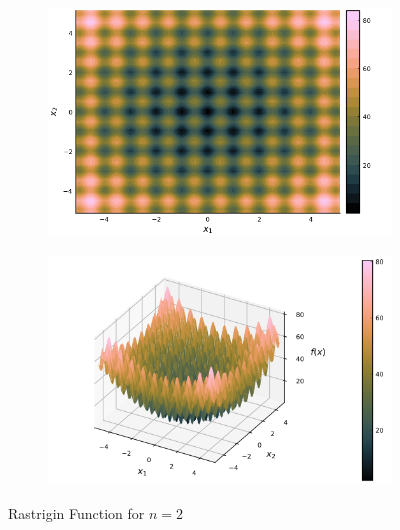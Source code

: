   \begin{figure}[ht!]
    \centering
    \begin{subfigure}[b]{0.4\textwidth}
      \centering
      \includegraphics[width=\textwidth]{img/test_functions/rastrigin_contour.png}
    \end{subfigure}
    \begin{subfigure}[b]{0.4\textwidth}
      \centering
      \includegraphics[width=\textwidth]{img/test_functions/rastrigin_surface.png}
    \end{subfigure}
    \caption{Rastrigin Function for \(n = 2\)}
    \label{fig:test_functions:rastrigin}
  \end{figure}